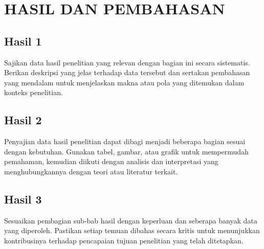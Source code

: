 \chapter{HASIL DAN PEMBAHASAN}

\section{Hasil 1}
Sajikan data hasil penelitian yang relevan dengan bagian ini secara sistematis. Berikan deskripsi yang jelas terhadap data tersebut dan sertakan pembahasan yang mendalam untuk menjelaskan makna atau pola yang ditemukan dalam konteks penelitian.

\section{Hasil 2}
Penyajian data hasil penelitian dapat dibagi menjadi beberapa bagian sesuai dengan kebutuhan. Gunakan tabel, gambar, atau grafik untuk mempermudah pemahaman, kemudian diikuti dengan analisis dan interpretasi yang menghubungkannya dengan teori atau literatur terkait.

\section{Hasil 3}
Sesuaikan pembagian sub-bab hasil dengan keperluan dan seberapa banyak data yang diperoleh. Pastikan setiap temuan dibahas secara kritis untuk menunjukkan kontribusinya terhadap pencapaian tujuan penelitian yang telah ditetapkan.
